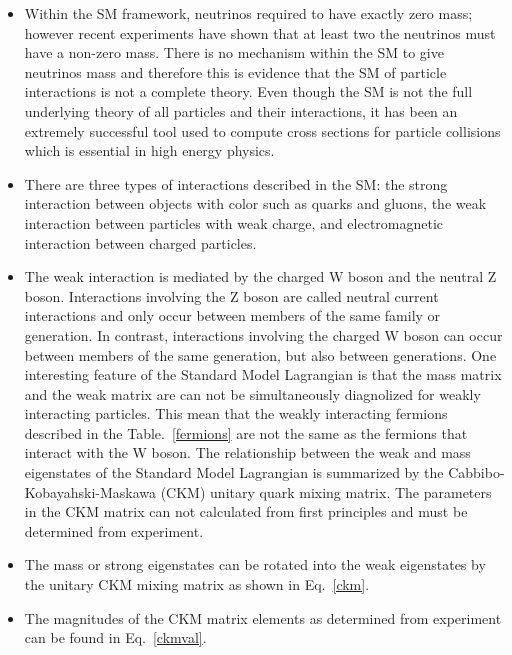 \begin{itemize}
\item Within the SM framework, neutrinos required to have exactly zero mass; however recent experiments have shown that at least two the neutrinos must have a non-zero mass. There is no mechanism within the SM to give neutrinos mass and therefore this is evidence that the SM of particle interactions is not a complete theory. Even though the SM is not the full underlying theory of all particles and their interactions, it has been an extremely successful tool used to compute cross sections for particle collisions which is essential in high energy physics.
\item There are three types of interactions described in the SM: the strong interaction between objects with color such as quarks and gluons, the weak interaction between particles with weak charge, and electromagnetic interaction between charged particles.
\item The weak interaction is mediated by the charged W boson and the neutral Z boson. Interactions involving the Z boson are called neutral current interactions and only occur between members of the same family or generation. In contrast, interactions involving the charged W boson can  occur between members of the same generation, but also between generations. One interesting feature of the Standard Model Lagrangian is that the mass matrix and the weak matrix are can not be simultaneously diagnolized for weakly interacting particles. This mean that the weakly interacting fermions described in the Table.~\ref{fermions} are not the same as the fermions that interact with the W boson. The relationship between the weak and mass eigenstates of the Standard Model Lagrangian is summarized by the Cabbibo-Kobayahski-Maskawa (CKM) unitary quark mixing matrix. The parameters in the CKM matrix can not calculated from first principles and must be determined from experiment.
\item The mass or strong eigenstates can be rotated into the weak eigenstates by the unitary CKM mixing matrix as shown in Eq.~\ref{ckm}.
\item The magnitudes of the CKM matrix elements as determined from experiment can be found in Eq.~\ref{ckmval}.

\end{itemize}
